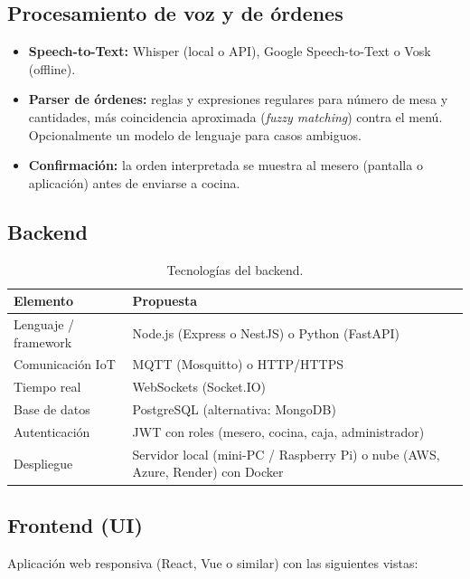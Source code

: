 \documentclass[11pt,letterpaper]{article}
\newcommand{\tabhead}[1]{\textbf{\color{white}#1}}
\newcommand{\encabezado}{\rowcolor{azulprincipal}}
\begin{document}
\subsection{Procesamiento de voz y de órdenes}
\begin{itemize}[noitemsep]
  \item \textbf{Speech-to-Text:} Whisper (local o API), Google Speech-to-Text o Vosk (offline).
  \item \textbf{Parser de órdenes:} reglas y expresiones regulares para número de mesa y cantidades, más coincidencia aproximada (\textit{fuzzy matching}) contra el menú. Opcionalmente un modelo de lenguaje para casos ambiguos.
  \item \textbf{Confirmación:} la orden interpretada se muestra al mesero (pantalla o aplicación) antes de enviarse a cocina.
\end{itemize}

\subsection{Backend}
\begin{table}[h!]
\centering
\begin{tabularx}{\textwidth}{l X}
\toprule
\encabezado \tabhead{Elemento} & \tabhead{Propuesta} \\
\midrule
Lenguaje / framework & Node.js (Express o NestJS) o Python (FastAPI) \\
Comunicación IoT & MQTT (Mosquitto) o HTTP/HTTPS \\
Tiempo real & WebSockets (Socket.IO) \\
Base de datos & PostgreSQL (alternativa: MongoDB) \\
Autenticación & JWT con roles (mesero, cocina, caja, administrador) \\
Despliegue & Servidor local (mini-PC / Raspberry Pi) o nube (AWS, Azure, Render) con Docker \\
\bottomrule
\end{tabularx}
\caption{Tecnologías del backend.}
\end{table}

\subsection{Frontend (UI)}
Aplicación web responsiva (React, Vue o similar) con las siguientes vistas:
\end{document}

